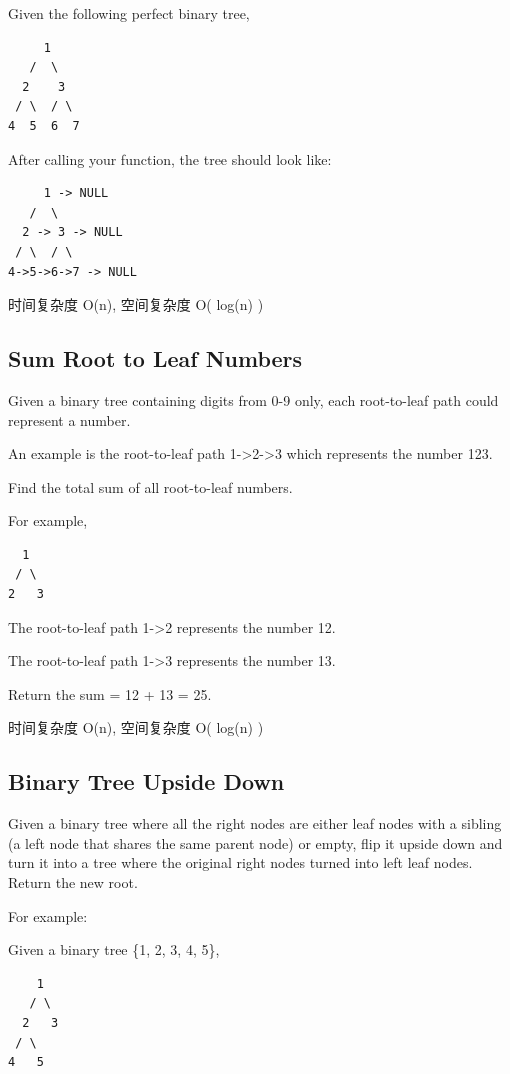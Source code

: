 \documentclass[12pt]{book}
\begin{document}
Given the following perfect binary tree,
\lstset{language=java,label= ,caption= ,numbers=none}
\begin{lstlisting}
     1
   /  \
  2    3
 / \  / \
4  5  6  7
\end{lstlisting}

After calling your function, the tree should look like:
\lstset{language=java,label= ,caption= ,numbers=none}
\begin{lstlisting}
     1 -> NULL
   /  \
  2 -> 3 -> NULL
 / \  / \
4->5->6->7 -> NULL
\end{lstlisting}

时间复杂度 O(n), 空间复杂度 O( log(n) )


\subsection{Sum Root to Leaf Numbers}
\label{sec-4-4-7}
Given a binary tree containing digits from 0-9 only, each root-to-leaf path could represent a number.

An example is the root-to-leaf path 1->2->3 which represents the number 123.

Find the total sum of all root-to-leaf numbers.

For example,
\lstset{language=java,label= ,caption= ,numbers=none}
\begin{lstlisting}
  1
 / \
2   3
\end{lstlisting}

The root-to-leaf path 1->2 represents the number 12.

The root-to-leaf path 1->3 represents the number 13.

Return the sum = 12 + 13 = 25.

时间复杂度 O(n), 空间复杂度 O( log(n) )


\subsection{Binary Tree Upside Down}
\label{sec-4-4-8}
Given a binary tree where all the right nodes are either leaf nodes with a sibling (a left node that shares the same parent node) or empty, flip it upside down and turn it into a tree where the original right nodes turned into left leaf nodes. Return the new root.

For example:

Given a binary tree \{1, 2, 3, 4, 5\},
\lstset{language=java,label= ,caption= ,numbers=none}
\begin{lstlisting}
    1
   / \
  2   3
 / \
4   5
\end{lstlisting}
\end{document}
